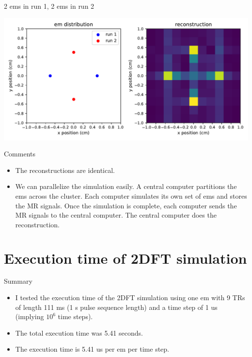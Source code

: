 \documentclass[dvipsnames]{beamer}
\begin{document}
\begin{frame}{2 ems in run 1, 2 ems in run 2}
\begin{center}
\includegraphics[width=\textwidth]{reconstruction_parallel}
\end{center}
\end{frame}

\begin{frame}{Comments}
\begin{itemize}
\item The reconstructions are identical.
\item We can parallelize the simulation easily. A central computer partitions the ems across the cluster. Each computer simulates its own set of ems and stores the MR signals. Once the simulation is complete, each computer sends the MR signals to the central computer. The central computer does the reconstruction.
\end{itemize}
\end{frame}

\section{Execution time of 2DFT simulation}

\begin{frame}{Summary}
\begin{itemize}
\item I tested the execution time of the 2DFT simulation using one em with 9 TRs of length 111 ms (1 s pulse sequence length) and a time step of 1 us (implying $10^6$ time steps).
\item The total execution time was 5.41 seconds.
\item The execution time is 5.41 us per em per time step.
\end{itemize}
\end{frame}
\end{document}
